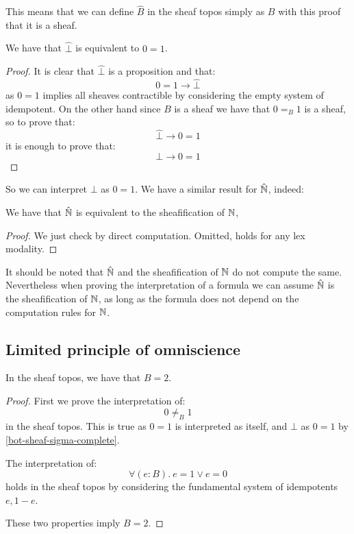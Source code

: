 This means that we can define $\hat{B}$ in the sheaf topos simply as $B$ with this proof that it is a sheaf.

\begin{lemma}\label{bot-sheaf-sigma-complete}
We have that $\hat{\bot}$ is equivalent to $0=1$.
\end{lemma}

\begin{proof}
It is clear that $\hat{\bot}$ is a proposition and that:
\[0=1 \to \hat{\bot}\]
as $0=1$ implies all sheaves contractible by considering the empty system of idempotent. On the other hand since $B$ is a sheaf we have that $0=_B 1$ is a sheaf, so to prove that:
\[\hat{\bot}\to 0=1\]
it is enough to prove that:
\[\bot\to 0=1\]
\end{proof}

So we can interpret $\bot$ as $0=1$. We have a similar result for $\hat{\mathbb{N}}$, indeed:

\begin{lemma}\label{N-sheafification-sigma-complete}
We have that $\hat{\mathbb{N}}$ is equivalent to the sheafification of $\mathbb{N}$,
\end{lemma}

\begin{proof}
We just check by direct computation. Omitted, holds for any lex modality.
\end{proof}

It should be noted that $\hat{\mathbb{N}}$ and the sheafification of $\mathbb{N}$ do not compute the same. Nevertheless when proving the interpretation of a formula we can assume $\hat{\mathbb{N}}$ is the sheafification of $\mathbb{N}$, as long as the formula does not depend on the computation rules for $\mathbb{N}$.


\subsection{Limited principle of omniscience}

\begin{lemma}\label{B-is-2-sigma-complete}
In the sheaf topos, we have that $B=2$.
\end{lemma}

\begin{proof}
First we prove the interpretation of:
\[0\not=_B1\] 
in the sheaf topos. This is true as $0=1$ is interpreted as itself, and $\bot$ as $0=1$ by \cref{bot-sheaf-sigma-complete}.

The interpretation of:
\[\forall(e:B).\ e=1 \lor e=0\]
holds in the sheaf topos by considering the fundamental system of idempotents $e,1-e$.

These two properties imply $B=2$.
\end{proof}


